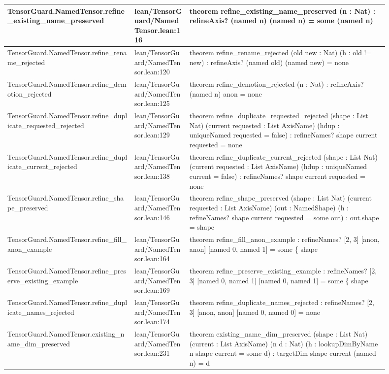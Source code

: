\documentclass[10pt]{article}
\begin{document}
\begin{longtable}{|p{0.30\linewidth}|p{0.13\linewidth}|p{0.47\linewidth}|}
\hline
TensorGuard.NamedTensor.refine\_existing\_name\_preserved & lean/TensorGuard/NamedTensor.lean:116 & theorem refine\_existing\_name\_preserved (n : Nat) : refineAxis? (named n) (named n) = some (named n) \\
\hline
TensorGuard.NamedTensor.refine\_rename\_rejected & lean/TensorGuard/NamedTensor.lean:120 & theorem refine\_rename\_rejected (old new : Nat) (h : old != new) : refineAxis? (named old) (named new) = none \\
\hline
TensorGuard.NamedTensor.refine\_demotion\_rejected & lean/TensorGuard/NamedTensor.lean:125 & theorem refine\_demotion\_rejected (n : Nat) : refineAxis? (named n) anon = none \\
\hline
TensorGuard.NamedTensor.refine\_duplicate\_requested\_rejected & lean/TensorGuard/NamedTensor.lean:129 & theorem refine\_duplicate\_requested\_rejected (shape : List Nat) (current requested : List AxisName) (hdup : uniqueNamed requested = false) : refineNames? shape current requested = none \\
\hline
TensorGuard.NamedTensor.refine\_duplicate\_current\_rejected & lean/TensorGuard/NamedTensor.lean:138 & theorem refine\_duplicate\_current\_rejected (shape : List Nat) (current requested : List AxisName) (hdup : uniqueNamed current = false) : refineNames? shape current requested = none \\
\hline
TensorGuard.NamedTensor.refine\_shape\_preserved & lean/TensorGuard/NamedTensor.lean:146 & theorem refine\_shape\_preserved (shape : List Nat) (current requested : List AxisName) (out : NamedShape) (h : refineNames? shape current requested = some out) : out.shape = shape \\
\hline
TensorGuard.NamedTensor.refine\_fill\_anon\_example & lean/TensorGuard/NamedTensor.lean:164 & theorem refine\_fill\_anon\_example : refineNames? [2, 3] [anon, anon] [named 0, named 1] = some \{ shape \\
\hline
TensorGuard.NamedTensor.refine\_preserve\_existing\_example & lean/TensorGuard/NamedTensor.lean:169 & theorem refine\_preserve\_existing\_example : refineNames? [2, 3] [named 0, named 1] [named 0, named 1] = some \{ shape \\
\hline
TensorGuard.NamedTensor.refine\_duplicate\_names\_rejected & lean/TensorGuard/NamedTensor.lean:174 & theorem refine\_duplicate\_names\_rejected : refineNames? [2, 3] [anon, anon] [named 0, named 0] = none \\
\hline
TensorGuard.NamedTensor.existing\_name\_dim\_preserved & lean/TensorGuard/NamedTensor.lean:231 & theorem existing\_name\_dim\_preserved (shape : List Nat) (current : List AxisName) (n d : Nat) (h : lookupDimByName n shape current = some d) : targetDim shape current (named n) = d \\

\end{longtable}
\end{document}
